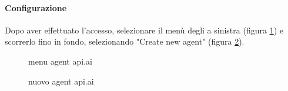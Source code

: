 \paragraph{Configurazione}
Dopo aver effettuato l'accesso, selezionare il menù degli  a sinistra (figura \ref{fig:menuapi}) e scorrerlo fino in fondo, selezionando "Create new agent" (figura \ref{fig:newAgent}). \\
\begin{figure}[h]
	\caption{menu agent api.ai}\label{fig:menuapi}
\end{figure}
\begin{figure}[h]
	\caption{nuovo agent api.ai}\label{fig:newAgent}
\end{figure}

